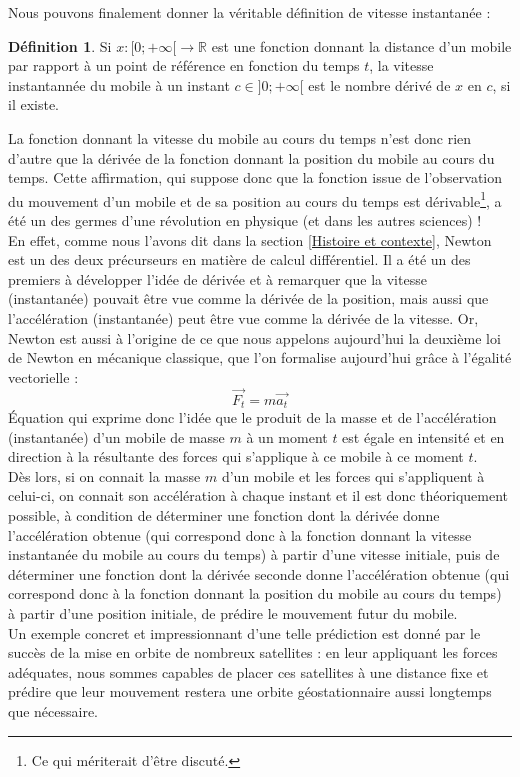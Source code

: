 \documentclass[a4paper,fontsize=13pt]{scrreprt}
\theoremstyle{plain}
\theoremstyle{definition}
\newtheorem{déf}[subsection]{Définition}
\newcommand{\rr}{\mathbb{R}}
\begin{document}
Nous pouvons finalement donner la véritable définition de vitesse instantanée :
\begin{déf}
Si $x : [0;+\infty[ \to \rr$ est une fonction donnant la distance d'un mobile par rapport à un point de référence en fonction du temps $t$, la vitesse instantannée du mobile à un instant $c \in ]0;+\infty[$ est le nombre dérivé de $x$ en $c$, si il existe.
\end{déf}
La fonction donnant la vitesse du mobile au cours du temps n'est donc rien d'autre que la dérivée de la fonction donnant la position du mobile au cours du temps. Cette affirmation, qui suppose donc que la fonction issue de l'observation du mouvement d'un mobile et de sa position au cours du temps est dérivable\footnote{Ce qui mériterait d'être discuté.}, a été un des germes d'une révolution en physique (et dans les autres sciences) !\\
En effet, comme nous l'avons dit dans la section \ref{Histoire et contexte}, Newton est un des deux précurseurs en matière de calcul différentiel. Il a été un des premiers à développer l'idée de dérivée et à remarquer que la vitesse (instantanée) pouvait être vue comme la dérivée de la position, mais aussi que l'accélération (instantanée) peut être vue comme la dérivée de la vitesse. Or, Newton est aussi à l'origine de ce que nous appelons aujourd'hui la deuxième loi de Newton en mécanique classique, que l'on formalise aujourd'hui grâce à l'égalité vectorielle :
$$\overrightarrow{F_t}=m\overrightarrow{a_t}$$
Équation qui exprime donc l'idée que le produit de la masse et de l'accélération (instantanée) d'un mobile de masse $m$ à un moment $t$ est égale en intensité et en direction à la résultante des forces qui s'applique à ce mobile à ce moment $t$.\\
Dès lors, si on connait la masse $m$ d'un mobile et les forces qui s'appliquent à celui-ci, on connait son accélération à chaque instant et il est donc théoriquement possible, à condition de déterminer une fonction dont la dérivée donne l'accélération obtenue (qui correspond donc à la fonction donnant la vitesse instantanée du mobile au cours du temps) à partir d'une vitesse initiale, puis de déterminer une fonction dont la dérivée seconde donne l'accélération obtenue (qui correspond donc à la fonction donnant la position du mobile au cours du temps) à partir d'une position initiale, de prédire le mouvement futur du mobile.\\
Un exemple concret et impressionnant d'une telle prédiction est donné par le succès de la mise en orbite de nombreux satellites : en leur appliquant les forces adéquates, nous sommes capables de placer ces satellites à une distance fixe et prédire que leur mouvement restera une orbite géostationnaire aussi longtemps que nécessaire.\\
\end{document}
